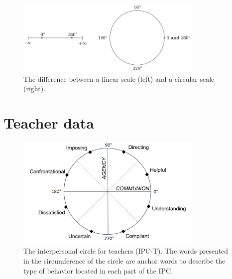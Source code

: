 \documentclass[12pt,]{article}
\begin{document}
\begin{figure}
\centering
\includegraphics[width = 0.8\textwidth]{Plots/circline.pdf}
\caption{The difference between a linear scale (left) and a circular scale (right).}
\label{circline}
\end{figure}

\section{Teacher data}\label{Example}

\begin{figure}
\centering
\includegraphics[width = 0.8\textwidth]{Plots/IPC-T.png}
\caption{The interpersonal circle for teachers (IPC-T). The words presented in
the circumference of the circle are anchor words to describe the type of
behavior located in each part of the IPC.}
\label{QTI}
\end{figure}
\end{document}
